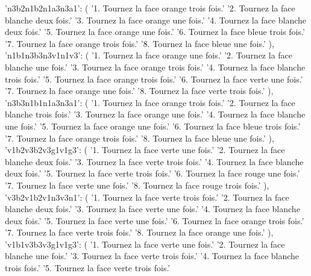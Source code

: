 {{        'n3b2n1b2n1a3n3a1': (
            '1. Tournez la face orange trois fois.\n'
            '2. Tournez la face blanche deux fois.\n'
            '3. Tournez la face orange une fois.\n'
            '4. Tournez la face blanche deux fois.\n'
            '5. Tournez la face orange une fois.\n'
            '6. Tournez la face bleue trois fois.\n'
            '7. Tournez la face orange trois fois.\n'
            '8. Tournez la face bleue une fois.'
        ),
        'n1b1n3b3n3v1n1v3': (
            '1. Tournez la face orange une fois.\n'
            '2. Tournez la face blanche une fois.\n'
            '3. Tournez la face orange trois fois.\n'
            '4. Tournez la face blanche trois fois.\n'
            '5. Tournez la face orange trois fois.\n'
            '6. Tournez la face verte une fois.\n'
            '7. Tournez la face orange une fois.\n'
            '8. Tournez la face verte trois fois.'
        ),
        'n3b3n1b1n1a3n3a1': (
            '1. Tournez la face orange trois fois.\n'
            '2. Tournez la face blanche trois fois.\n'
            '3. Tournez la face orange une fois.\n'
            '4. Tournez la face blanche une fois.\n'
            '5. Tournez la face orange une fois.\n'
            '6. Tournez la face bleue trois fois.\n'
            '7. Tournez la face orange trois fois.\n'
            '8. Tournez la face bleue une fois.'
        ),
        'v1b2v3b2v3g1v1g3': (
            '1. Tournez la face verte une fois.\n'
            '2. Tournez la face blanche deux fois.\n'
            '3. Tournez la face verte trois fois.\n'
            '4. Tournez la face blanche deux fois.\n'
            '5. Tournez la face verte trois fois.\n'
            '6. Tournez la face rouge une fois.\n'
            '7. Tournez la face verte une fois.\n'
            '8. Tournez la face rouge trois fois.'
        ),
        'v3b2v1b2v1n3v3n1': (
            '1. Tournez la face verte trois fois.\n'
            '2. Tournez la face blanche deux fois.\n'
            '3. Tournez la face verte une fois.\n'
            '4. Tournez la face blanche deux fois.\n'
            '5. Tournez la face verte une fois.\n'
            '6. Tournez la face orange trois fois.\n'
            '7. Tournez la face verte trois fois.\n'
            '8. Tournez la face orange une fois.'
        ),
        'v1b1v3b3v3g1v1g3': (
            '1. Tournez la face verte une fois.\n'
            '2. Tournez la face blanche une fois.\n'
            '3. Tournez la face verte trois fois.\n'
            '4. Tournez la face blanche trois fois.\n'
            '5. Tournez la face verte trois fois.\n'
}}
